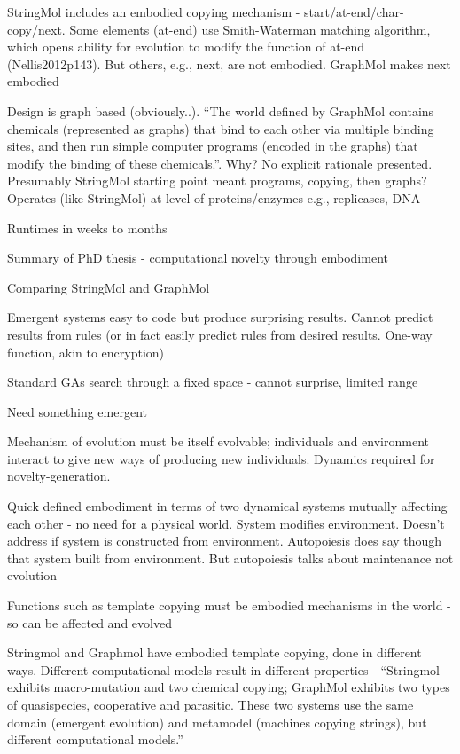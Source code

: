 StringMol includes an embodied copying mechanism - start/at-end/char-copy/next. Some elements (at-end) use Smith-Waterman matching algorithm, which opens ability for evolution to modify the function of at-end (Nellis2012p143). But others, e.g., next, are not embodied. GraphMol makes next embodied

Design is graph based (obviously..). ``The world defined by GraphMol contains chemicals (represented as graphs) that bind to each other via multiple binding sites, and then run simple computer programs (encoded in the graphs) that modify the binding of these chemicals.''. Why? No explicit rationale presented. Presumably StringMol starting point meant programs, copying, then graphs? 
Operates (like StringMol) at level of proteins/enzymes e.g., replicases, DNA

Runtimes in weeks to months

\autocite{Nellis2014}

Summary of PhD thesis - computational novelty through embodiment

Comparing StringMol and GraphMol

Emergent systems easy to code but produce surprising results. Cannot predict results from rules (or in fact easily predict rules from desired results. One-way function, akin to encryption)

Standard GAs search through a fixed space - cannot surprise, limited range

Need something emergent

Mechanism of evolution must be itself evolvable; individuals and environment interact to give new ways of producing new individuals.
Dynamics required for novelty-generation.

Quick defined embodiment in terms of two dynamical systems mutually affecting each other - no need for a physical world. System modifies environment. Doesn't address if system is constructed from environment. Autopoiesis does say though that system built from environment. But autopoiesis talks about maintenance not evolution

Functions such as template copying must be embodied mechanisms in the world - so can be affected and evolved


Stringmol and Graphmol have embodied template copying, done in different ways. Different computational models result in different properties - ``Stringmol exhibits macro-mutation and two chemical copying; GraphMol exhibits two types of quasispecies, cooperative and parasitic. These two systems use the same domain (emergent evolution) and metamodel (machines copying strings), but different computational models.''

